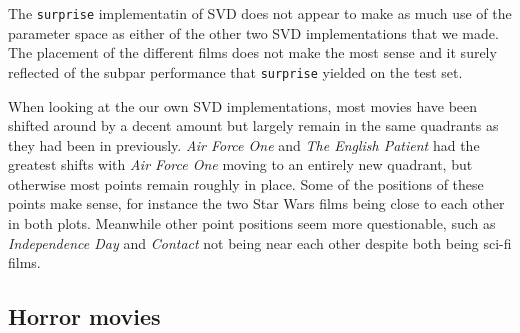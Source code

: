The \texttt{surprise} implementatin of SVD does not appear to make as much use of the parameter space as either of the other two 
SVD implementations that we made. The placement of the different films does not make the most sense and it surely reflected of the 
subpar performance that \texttt{surprise} yielded on the test set.
\par 
When looking at the our own SVD implementations, most movies have been shifted around by a decent amount but largely remain in the same 
quadrants as they had been in previously. \textit{Air Force One} and \textit{The English Patient} had the greatest shifts with \textit{Air 
Force One} moving to an entirely new quadrant, but otherwise most points remain roughly in place. Some of the positions of these points make 
sense, for instance the two Star Wars films being close to each other in both plots. Meanwhile other point positions seem more questionable, 
such as \textit{Independence Day} and \textit{Contact} not being near each other despite both being sci-fi films.

\subsection{Horror movies}

